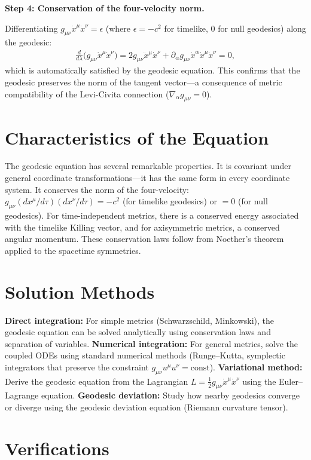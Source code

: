 \textbf{Step 4: Conservation of the four-velocity norm.}

Differentiating $g_{\mu\nu}\dot{x}^\mu\dot{x}^\nu = \epsilon$ (where $\epsilon = -c^2$ for timelike, $0$ for null geodesics) along the geodesic:
\begin{align}
\frac{d}{d\lambda}\bigl(g_{\mu\nu}\dot{x}^\mu\dot{x}^\nu\bigr) = 2g_{\mu\nu}\ddot{x}^\mu\dot{x}^\nu + \partial_\alpha g_{\mu\nu}\dot{x}^\alpha\dot{x}^\mu\dot{x}^\nu = 0,
\end{align}
which is automatically satisfied by the geodesic equation. This confirms that the geodesic preserves the norm of the tangent vector---a consequence of metric compatibility of the Levi-Civita connection ($\nabla_\alpha g_{\mu\nu} = 0$).

\section*{Characteristics of the Equation}

The geodesic equation has several remarkable properties. It is covariant under general coordinate transformations---it has the same form in every coordinate system. It conserves the norm of the four-velocity: $g_{\mu\nu}(dx^\mu/d\tau)(dx^\nu/d\tau) = -c^2$ (for timelike geodesics) or $= 0$ (for null geodesics). For time-independent metrics, there is a conserved energy associated with the timelike Killing vector, and for axisymmetric metrics, a conserved angular momentum. These conservation laws follow from Noether's theorem applied to the spacetime symmetries.
\section*{Solution Methods}

\textbf{Direct integration:} For simple metrics (Schwarzschild, Minkowski), the geodesic equation can be solved analytically using conservation laws and separation of variables. \textbf{Numerical integration:} For general metrics, solve the coupled ODEs using standard numerical methods (Runge--Kutta, symplectic integrators that preserve the constraint $g_{\mu\nu}u^\mu u^\nu = \text{const}$). \textbf{Variational method:} Derive the geodesic equation from the Lagrangian $L = \frac{1}{2}g_{\mu\nu}\dot{x}^\mu\dot{x}^\nu$ using the Euler--Lagrange equation. \textbf{Geodesic deviation:} Study how nearby geodesics converge or diverge using the geodesic deviation equation (Riemann curvature tensor).
\section*{Verifications}

